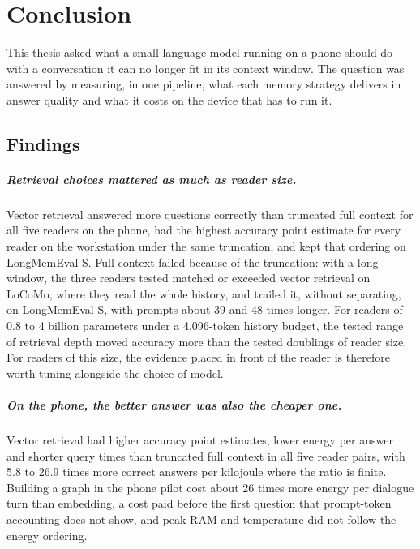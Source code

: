 
\chapter{Conclusion}
\label{ch:conclusion}

This thesis asked what a small language model running on a phone should do with a conversation it
can no longer fit in its context window. The question was answered by measuring, in one pipeline,
what each memory strategy delivers in answer quality and what it costs on the device that has to
run it.

\section{Findings}
\label{sec:ch10_findings}

\paragraph{Retrieval choices mattered as much as reader size.}
Vector retrieval answered more questions correctly than truncated full context for all five readers
on the phone, had the highest accuracy point estimate for every reader on the workstation under the
same truncation, and kept that ordering on LongMemEval-S. Full context failed because of the
truncation: with a long window, the three readers tested matched or exceeded vector retrieval on
LoCoMo, where they read the whole history, and trailed it, without separating, on LongMemEval-S, with prompts about 39 and 48 times
longer. For readers of 0.8 to 4 billion parameters under a 4,096-token history
budget, the tested range of retrieval depth moved accuracy more than the tested doublings of reader
size. For readers of this size, the evidence placed in front of the reader is therefore worth tuning
alongside the choice of model.

\paragraph{On the phone, the better answer was also the cheaper one.}
Vector retrieval had higher accuracy point estimates, lower energy per answer and shorter query times
than truncated full context in all five reader pairs, with 5.8 to 26.9 times more correct answers per
kilojoule where the ratio is finite. Building a graph in the phone pilot cost about 26 times more
energy per dialogue turn than embedding, a cost paid before the first question that prompt-token
accounting does not show, and peak RAM and temperature did not follow the energy ordering.

